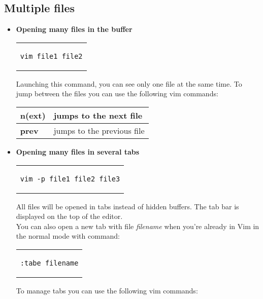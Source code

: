 \subsection{Multiple files}
\begin{itemize}
\item{\textbf{Opening many files in the buffer}\\
\begin{center}
\begin{tabular}{c}
\begin{lstlisting}[linewidth=80pt, basicstyle=\footnotesize\sffamily,]
vim file1 file2
\end{lstlisting}
\end{tabular}
\end{center}
Launching this command, you can see only one file at the same time. To jump between the files you can use the following vim commands:
\begin{table}[h]
\centering
\footnotesize
\begin{tabular}{|l|l|}
\hline
\textbf{n(ext)} & {jumps to the next file}\\
\hline
\textbf{prev} & {jumps to the previous file}\\
\hline
\end{tabular}
\end{table}
}
\item{\textbf{Opening many files in several tabs}\\
\begin{center}
\begin{tabular}{c}
\begin{lstlisting}[linewidth=130pt, basicstyle=\footnotesize\sffamily,]
vim -p file1 file2 file3
\end{lstlisting}
\end{tabular}
\end{center}
All files will be opened in tabs instead of hidden buffers. The tab bar is displayed on the top of the editor.\\
You can also open a new tab with file \textit{filename} when you're already in Vim in the normal mode with command:
\begin{center}
\begin{tabular}{c}
\begin{lstlisting}[linewidth=80pt, basicstyle=\footnotesize\sffamily,]
:tabe filename
\end{lstlisting}
\end{tabular}
\end{center}
To manage tabs you can use the following vim commands:
}
\end{itemize}
